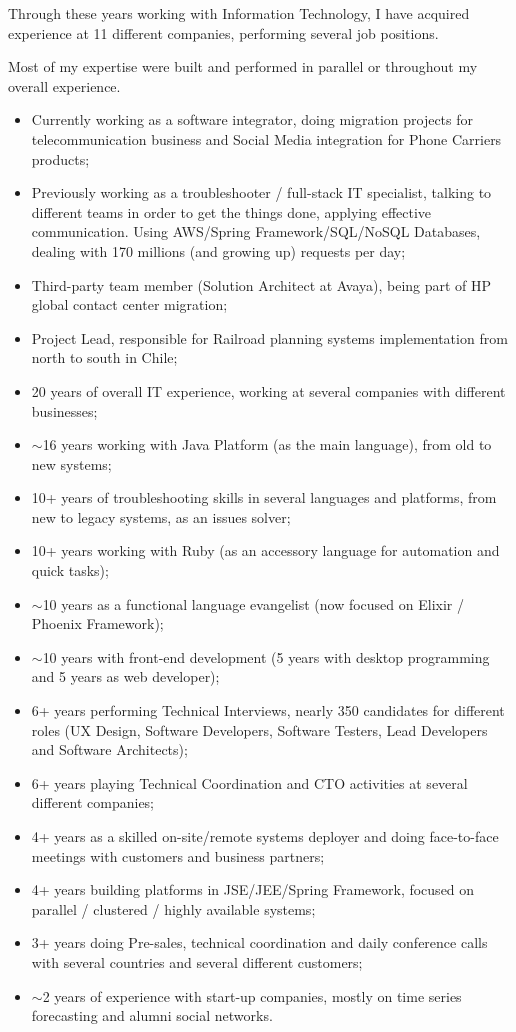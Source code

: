
\begin{cvparagraph}
Through these years working with Information Technology, I have acquired experience at 11 different companies, performing several job positions.

Most of my expertise were built and performed in parallel or throughout my overall experience.

\begin{itemize}
\item Currently working as a software integrator, doing migration projects for telecommunication business and Social Media integration for Phone Carriers products;
\item Previously working as a troubleshooter / full-stack IT specialist, talking to different teams in order to get the things done, applying effective communication. Using AWS/Spring Framework/SQL/NoSQL Databases, dealing with 170 millions (and growing up) requests per day;
\item Third-party team member (Solution Architect at Avaya), being part of HP global contact center migration;
\item Project Lead, responsible for Railroad planning systems implementation from north to south in Chile;
\item 20 years of overall IT experience, working at several companies with different businesses;
\item $\sim$16 years working with Java Platform (as the main language), from old to new systems;
\item 10+ years of troubleshooting skills in several languages and platforms, from new to legacy systems, as an issues solver;
\item 10+ years working with Ruby  (as an accessory language for automation and quick tasks);
\item $\sim$10 years as a functional language evangelist (now focused on Elixir / Phoenix Framework);
\item $\sim$10 years with front-end development (5 years with desktop programming and 5 years as web developer);
\item 6+ years performing Technical Interviews, nearly 350 candidates for different roles (UX Design, Software Developers, Software Testers, Lead Developers and Software Architects);
\item 6+ years playing Technical Coordination and CTO activities at several different companies;
\item 4+ years as a skilled on-site/remote systems deployer and doing face-to-face meetings with customers and business partners;
\item 4+ years building platforms in JSE/JEE/Spring Framework, focused on parallel / clustered / highly available systems;
\item 3+ years doing Pre-sales, technical coordination and daily conference calls with several countries and several different customers;
\item $\sim$2 years of experience with start-up companies, mostly on time series forecasting and alumni social networks.
\end{itemize}
\end{cvparagraph}
